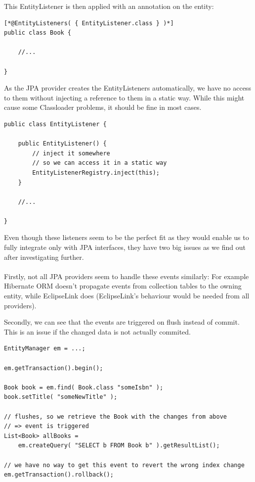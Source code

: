 \noindent
This EntityListener is then applied with an annotation on the entity:
\\
\lstset{language=java}
\begin{lstlisting}[frame=htrbl, caption={Using a JPA entity listener}, label={lst:using_jpa_entitylisteners.java}]
[*@EntityListeners( { EntityListener.class } )*]
public class Book {

	//...

}
\end{lstlisting}
\noindent
As the JPA provider creates the EntityListeners automatically, we have no access to them without injecting a reference to them in a static way. While this might cause some Classloader problems, it should be fine in most cases.
\\
\lstset{language=java}
\begin{lstlisting}[frame=htrbl, caption={Injecting the EntityListener}, label={lst:jpa_entity_listener.java}]
public class EntityListener {

	public EntityListener() {
		// inject it somewhere
		// so we can access it in a static way
		EntityListenerRegistry.inject(this);
	}

	//...

}
\end{lstlisting}

\pagebreak

\noindent
Even though these listeners seem to be the perfect fit as they would enable us to fully integrate only with JPA interfaces, they have two big issues as we find out after investigating further.
\\\\
Firstly, not all JPA providers seem to handle these events similarly: For example Hibernate ORM doesn't propagate events from collection tables to the owning entity, while EclipseLink does (EclipseLink's behaviour would be needed from all providers).

Secondly, we can see that the events are triggered on flush instead of commit. This is an issue if the changed data is not actually commited.
\\

\lstset{language=java}
\begin{lstlisting}[frame=htrbl, caption={Event triggering on flush}, label={lst:flush_event.java}]
EntityManager em = ...;

em.getTransaction().begin();

Book book = em.find( Book.class "someIsbn" );
book.setTitle( "someNewTitle" );

// flushes, so we retrieve the Book with the changes from above
// => event is triggered
List<Book> allBooks = 
	em.createQuery( "SELECT b FROM Book b" ).getResultList();

// we have no way to get this event to revert the wrong index change
em.getTransaction().rollback();
\end{lstlisting}

